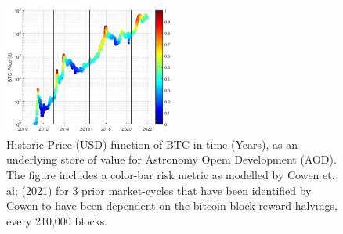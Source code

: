 \documentclass[final,5p,times,twocolumn,authoryear]{elsarticle}
\begin{document}
 \begin{figure}[h!]
    \centering
    \label{fig:cowen}
  \caption{Historic Price (USD) function of BTC in time (Years), as an underlying store of value for Astronomy Opem Development (AOD). The figure includes a color-bar risk metric as modelled by Cowen et. al; (2021) for 3 prior market-cycles that have been identified by Cowen to have been dependent on the bitcoin block reward halvings, every 210,000 blocks.}
  \includegraphics[width=0.5\textwidth]{figs/cowen2.eps}
\end{figure}
\end{document}
